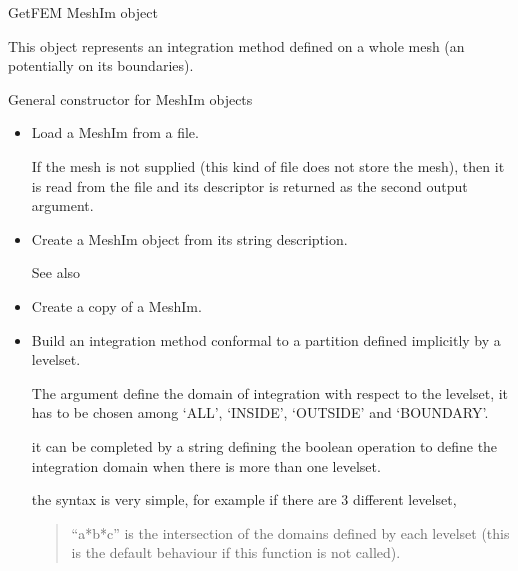 \documentclass[a4paper,11pt,english]{sphinxmanual}
\begin{document}
\begin{fulllineitems}
\label{\detokenize{python/cmdref_MeshIm:getfem.MeshIm}}
GetFEM MeshIm object

This object represents an integration method defined on a whole mesh (an 
potentially on its boundaries).

General constructor for MeshIm objects
\begin{itemize}
\item {} 
Load a MeshIm from a file.

If the mesh  is not supplied (this kind of file does not store the
mesh), then it is read from the file and its descriptor is returned as
the second output argument.

\item {} 
Create a MeshIm object from its string description.

See also 

\item {} 
Create a copy of a MeshIm.

\item {} 
Build an integration method conformal to a partition defined
implicitly by a levelset.

The  argument define the domain of integration with respect to
the levelset, it has to be chosen among ‘ALL’, ‘INSIDE’, ‘OUTSIDE’ and
‘BOUNDARY’.

it can be completed by a string defining the boolean operation
to define the integration domain when there is more than one levelset.

the syntax is very simple, for example if there are 3 different
levelset,
\begin{quote}

“a*b*c” is the intersection of the domains defined by each
levelset (this is the default behaviour if this function is not
called).


\end{quote}
\end{itemize}
\end{fulllineitems}
\end{document}
